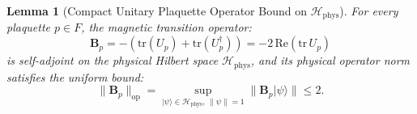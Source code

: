 \documentclass[11pt,reqno]{article}
\newtheorem{lemma}[theorem]{Lemma}
\begin{document}
\begin{lemma}[Compact Unitary Plaquette Operator Bound on $\mathcal{H}_{\mathrm{phys}}$]
\label{lem:plaquette_bound}
For every plaquette $p \in F$, the magnetic transition operator:
\begin{equation}
    \label{eq:plaquette_def}
    \mathbf{B}_p = -\left(\mathrm{tr}(U_p) + \mathrm{tr}(U_p^\dagger)\right) = -2\,\mathrm{Re}(\mathrm{tr}\,U_p)
\end{equation}
is self-adjoint on the physical Hilbert space $\mathcal{H}_{\mathrm{phys}}$, and its physical operator norm satisfies the uniform bound:
\begin{equation}
    \label{eq:plaquette_norm_bound}
    \|\mathbf{B}_p\|_{\mathrm{op}} = \sup_{|\psi\rangle \in \mathcal{H}_{\mathrm{phys}}, \, \|\psi\|=1} \|\mathbf{B}_p |\psi\rangle\| \le 2.
\end{equation}
\end{lemma}
\end{document}
